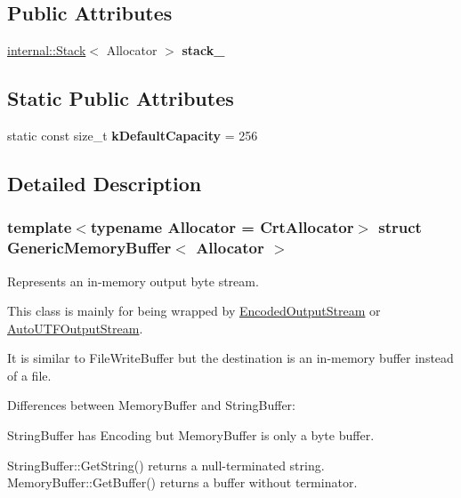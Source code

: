 \subsection*{Public Attributes}
\begin{DoxyCompactItemize}
\item 
\mbox{\label{a02212_a977b479180bebe8ae14ca1c11d52a486}} 
\hyperlink{a02288}{internal\+::\+Stack}$<$ Allocator $>$ {\bfseries stack\+\_\+}
\end{DoxyCompactItemize}
\subsection*{Static Public Attributes}
\begin{DoxyCompactItemize}
\item 
\mbox{\label{a02212_af6ecdbdbb8d3aa53cdef6e788e4980be}} 
static const size\+\_\+t {\bfseries k\+Default\+Capacity} = 256
\end{DoxyCompactItemize}


\subsection{Detailed Description}
\subsubsection*{template$<$typename Allocator = Crt\+Allocator$>$\newline
struct Generic\+Memory\+Buffer$<$ Allocator $>$}

Represents an in-\/memory output byte stream. 

This class is mainly for being wrapped by \hyperlink{a02132}{Encoded\+Output\+Stream} or \hyperlink{a02140}{Auto\+U\+T\+F\+Output\+Stream}.

It is similar to File\+Write\+Buffer but the destination is an in-\/memory buffer instead of a file.

Differences between Memory\+Buffer and String\+Buffer\+:
\begin{DoxyEnumerate}
\item String\+Buffer has Encoding but Memory\+Buffer is only a byte buffer.
\item String\+Buffer\+::\+Get\+String() returns a null-\/terminated string. Memory\+Buffer\+::\+Get\+Buffer() returns a buffer without terminator.
\end{DoxyEnumerate}


